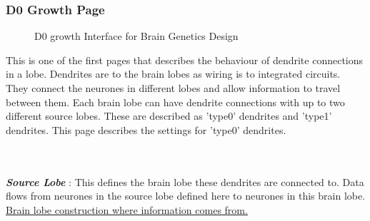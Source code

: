 \documentclass[11pt,twoside,a4paper]{article}
\begin{document}
\subsubsection{D0 Growth Page}

\begin{minipage}{0.4\linewidth}
\begin{figure}[H]
	\centerline {} %
	\caption{D0 growth Interface for Brain Genetics Design}
	\label{fig:brain_d0growth}
\end{figure}
\end{minipage}
\begin{minipage}{0.1\linewidth}\end{minipage}
\begin{minipage}{0.5\linewidth}
This is one of the first pages that describes the behaviour of dendrite connections in a lobe. Dendrites are to the brain lobes as wiring is to integrated circuits. They connect the neurones in different lobes and allow information to travel between them. Each brain lobe can have dendrite connections with up to two different source lobes. These are described as 'type0' dendrites and 'type1' dendrites. This page describes the settings for 'type0' dendrites.
\end{minipage}~\\~\\


\textbf{\textit{Source Lobe}} : This defines the brain lobe these dendrites are connected to. Data flows from neurones in the source lobe defined here to neurones in this brain lobe. \underline{Brain lobe construction  where information comes from.}~\\ %
\end{document}
